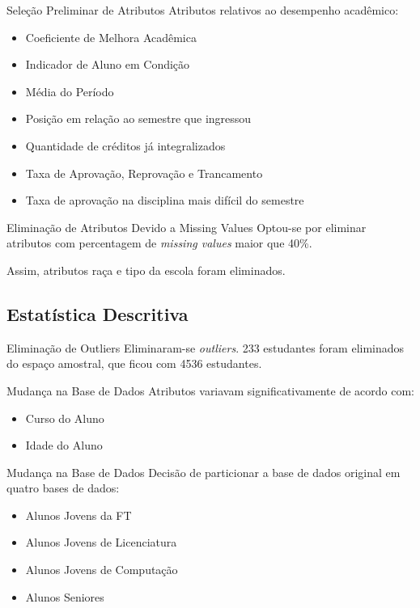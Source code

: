 \begin{frame}{Seleção Preliminar de Atributos}
    Atributos relativos ao desempenho acadêmico: 
    \begin{itemize}
        \item Coeficiente de Melhora Acadêmica
        \item Indicador de Aluno em Condição
        \item Média do Período
        \item Posição em relação ao semestre que ingressou
        \item Quantidade de créditos já integralizados
        \item Taxa de Aprovação, Reprovação e Trancamento
        \item Taxa de aprovação na disciplina mais difícil do semestre
    \end{itemize}
\end{frame}

\begin{frame}{Eliminação de Atributos Devido a Missing Values}
    Optou-se por eliminar atributos com percentagem de \textit{missing values} maior que 40\%.
        
    \vspace{0.5cm}
    
    Assim, atributos raça e tipo da escola foram eliminados. 
\end{frame}

\subsection{Estatística Descritiva}
\begin{frame}{Eliminação de Outliers}
    Eliminaram-se \textit{outliers}. 233 estudantes foram eliminados do espaço amostral,
    que ficou com 4536 estudantes.  
\end{frame}

\begin{frame}{Mudança na Base de Dados}
    Atributos variavam significativamente de acordo com: 
    \begin{itemize}
        \item Curso do Aluno
        \item Idade do Aluno
    \end{itemize}
\end{frame}

\begin{frame}{Mudança na Base de Dados}
    Decisão de particionar a base de dados original em quatro bases de dados:
    \begin{itemize}
        \item Alunos Jovens da FT
        \item Alunos Jovens de Licenciatura
        \item Alunos Jovens de Computação
        \item Alunos Seniores
    \end{itemize}
\end{frame}

